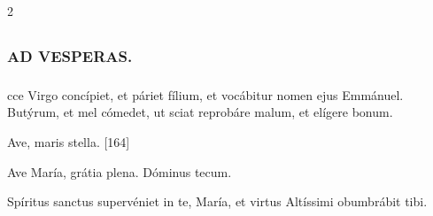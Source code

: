 \documentclass[9pt,twoside]{extarticle}
\begin{document}
\begin{multicols}{2}
\subsection*{\center {}}
\begin{tightlist}{}
\item {}
\item {}
\item {}
\end{tightlist}
\subsubsection*{\center \textsc{AD VESPERAS.}}

\subsubsection*{}
cce Virgo concípiet, et páriet fílium, et vocábitur nomen ejus Emmánuel. Butýrum, et mel cómedet, ut sciat reprobáre malum, et elígere bonum.

\begin{tightlist}{}
\item {} Ave, maris stella. [164]
\item {} Ave María, grátia plena.  Dóminus tecum.
\item {} Spíritus sanctus supervéniet in te, María, et virtus Altíssimi obumbrábit tibi.
\end{tightlist}


\end{multicols}
\end{document}
